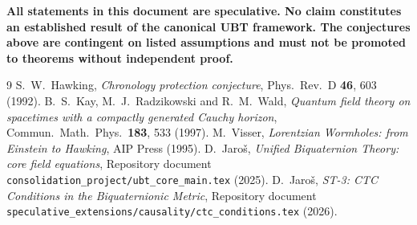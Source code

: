 \documentclass[12pt]{article}
\begin{document}
\medskip
\noindent\textbf{All statements in this document are speculative.  No
claim constitutes an established result of the canonical UBT framework.
The conjectures above are contingent on listed assumptions and must not
be promoted to theorems without independent proof.}


\begin{thebibliography}{9}
  S.~W.~Hawking,
  \emph{Chronology protection conjecture},
  Phys.\ Rev.\ D \textbf{46}, 603 (1992).
  B.~S.~Kay, M.~J.~Radzikowski and R.~M.~Wald,
  \emph{Quantum field theory on spacetimes with a compactly generated
  Cauchy horizon},
  Commun.\ Math.\ Phys.\ \textbf{183}, 533 (1997).
  M.~Visser,
  \emph{Lorentzian Wormholes: from Einstein to Hawking},
  AIP Press (1995).
  D.~Jaroš,
  \emph{Unified Biquaternion Theory: core field equations},
  Repository document \texttt{consolidation\_project/ubt\_core\_main.tex} (2025).
  D.~Jaroš,
  \emph{ST-3: CTC Conditions in the Biquaternionic Metric},
  Repository document
  \texttt{speculative\_extensions/causality/ctc\_conditions.tex} (2026).
\end{thebibliography}
\end{document}
